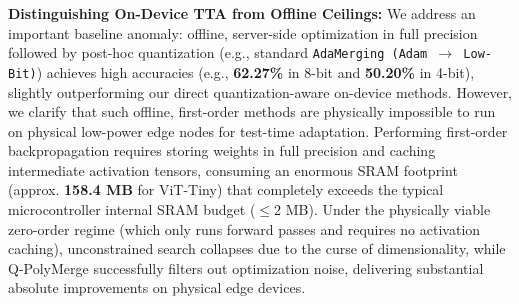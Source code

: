 \textbf{Distinguishing On-Device TTA from Offline Ceilings:} We address an important baseline anomaly: offline, server-side optimization in full precision followed by post-hoc quantization (e.g., standard \texttt{AdaMerging (Adam $\to$ Low-Bit)}) achieves high accuracies (e.g., \textbf{62.27\%} in 8-bit and \textbf{50.20\%} in 4-bit), slightly outperforming our direct quantization-aware on-device methods. However, we clarify that such offline, first-order methods are physically impossible to run on physical low-power edge nodes for test-time adaptation. Performing first-order backpropagation requires storing weights in full precision and caching intermediate activation tensors, consuming an enormous SRAM footprint (approx. \textbf{158.4 MB} for ViT-Tiny) that completely exceeds the typical microcontroller internal SRAM budget ($\le 2$ MB). Under the physically viable zero-order regime (which only runs forward passes and requires no activation caching), unconstrained search collapses due to the curse of dimensionality, while Q-PolyMerge successfully filters out optimization noise, delivering substantial absolute improvements on physical edge devices.